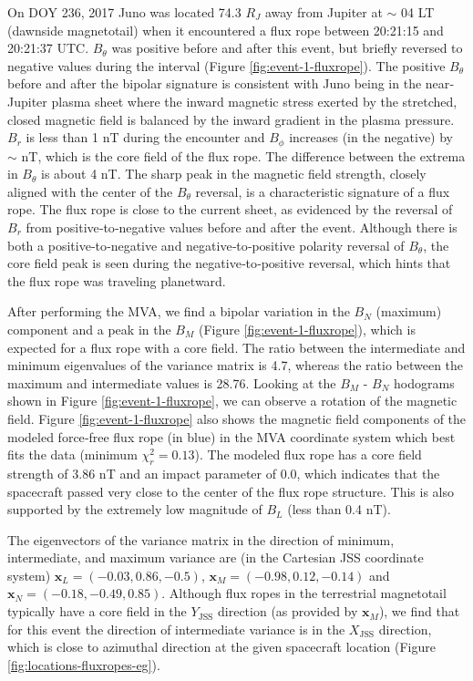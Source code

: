 On DOY 236, 2017 Juno was located 74.3 $R_J$ away from Jupiter at $\sim$ 04 LT (dawnside magnetotail) when it encountered a flux rope between 20:21:15 and 20:21:37 UTC. $B_\theta$ was positive before and after this event, but briefly reversed to negative values during the interval (Figure \ref{fig:event-1-fluxrope}). The positive $B_\theta$ before and after the bipolar signature is consistent with Juno being in the near‐Jupiter plasma sheet where the inward magnetic stress exerted by the stretched, closed magnetic field is balanced by the inward gradient in the plasma pressure. $B_r$ is less than 1 nT during the encounter and $B_\phi$ increases (in the negative) by $\sim$ nT, which is the core field of the flux rope. The difference between the extrema in $B_\theta$ is about 4 nT. The sharp peak in the magnetic field strength, closely aligned with the center of the $B_\theta$ reversal, is a characteristic signature of a flux rope. The flux rope is close to the current sheet, as evidenced by the reversal of $B_r$ from positive‐to‐negative values before and after the event. Although there is both a positive‐to‐negative and negative‐to‐positive polarity reversal of $B_\theta$, the core field peak is seen during the negative‐to‐positive reversal, which hints that the flux rope was traveling planetward.

After performing the MVA, we find a bipolar variation in the $B_N$ (maximum) component and a peak in the $B_M$ (Figure \ref{fig:event-1-fluxrope}), which is expected for a flux rope with a core field. The ratio between the intermediate and minimum eigenvalues of the variance matrix is 4.7, whereas the ratio between the maximum and intermediate values is 28.76. Looking at the $B_M$ - $B_N$ hodograms shown in Figure \ref{fig:event-1-fluxrope}, we can observe a rotation of the magnetic field. Figure \ref{fig:event-1-fluxrope} also shows the magnetic field components of the modeled force‐free flux rope (in blue) in the MVA coordinate system which best fits the data (minimum $\chi_r^2 = 0.13$). The modeled flux rope has a core field strength of 3.86 nT and an impact parameter of 0.0, which indicates that the spacecraft passed very close to the center of the flux rope structure. This is also supported by the extremely low magnitude of $B_L$ (less than 0.4 nT).

The eigenvectors of the variance matrix in the direction of minimum, intermediate, and maximum variance are (in the Cartesian JSS coordinate system) $\mathbf{x}_L=(-0.03,0.86,-0.5)$, $\mathbf{x}_M=(-0.98,0.12,-0.14)$ and $\mathbf{x}_N=(-0.18,-0.49,0.85)$. Although flux ropes in the terrestrial magnetotail typically have a core field in the $Y_\text{JSS}$ direction (as provided by $\mathbf{x}_M$), we find that for this event the direction of intermediate variance is in the $X_\text{JSS}$ direction, which is close to azimuthal direction at the given spacecraft location (Figure \ref{fig:locations-fluxropes-eg}).

